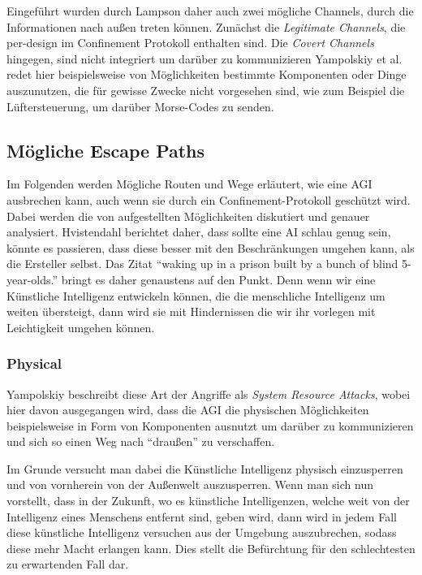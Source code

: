         Eingeführt wurden durch Lampson daher auch zwei mögliche Channels, durch die Informationen nach außen treten
        können.\cite{yampolskiy2012leakproofing} Zunächst die \textit{Legitimate Channels}, die per-design im Confinement
        Protokoll enthalten sind. Die \textit{Covert Channels} hingegen, sind nicht integriert um darüber zu kommunizieren
        Yampolskiy et al. redet hier beispielsweise von Möglichkeiten bestimmte Komponenten oder Dinge auszunutzen, die
        für gewisse Zwecke nicht vorgesehen sind, wie zum Beispiel die Lüftersteuerung, um darüber Morse-Codes zu senden.

        \subsection{Mögliche Escape Paths}
        Im Folgenden werden Mögliche Routen und Wege erläutert, wie eine AGI ausbrechen kann, auch wenn sie durch ein
        Confinement-Protokoll geschützt wird. Dabei werden die von \citep{yampolskiy2012leakproofing} aufgestellten
        Möglichkeiten diskutiert und genauer analysiert. Hvistendahl berichtet daher, dass sollte eine AI schlau genug
        sein, könnte es passieren, dass diese besser mit den Beschränkungen umgehen kann, als die Ersteller selbst.
        \cite{hvistendahl_2019} Das Zitat ``waking up in a prison built by a bunch of blind 5-year-olds.'' bringt es
        daher genaustens auf den Punkt. Denn wenn wir eine Künstliche Intelligenz entwickeln können, die die menschliche
        Intelligenz um weiten übersteigt, dann wird sie mit Hindernissen die wir ihr vorlegen mit Leichtigkeit umgehen
        können.

        \subsubsection{Physical}
        Yampolskiy beschreibt diese Art der Angriffe als \textit{System Resource Attacks}, wobei hier davon ausgegangen
        wird, dass die AGI die physischen Möglichkeiten beispielsweise in Form von Komponenten ausnutzt um darüber zu
        kommunizieren und sich so einen Weg nach ``draußen'' zu verschaffen.\cite{yampolskiy2012leakproofing}

        Im Grunde versucht man dabei die Künstliche Intelligenz physisch einzusperren und von vornherein von der Außenwelt
        auszusperren. Wenn man sich nun vorstellt, dass in der Zukunft, wo es künstliche Intelligenzen, welche weit von
        der Intelligenz eines Menschens entfernt sind, geben wird, dann wird in jedem Fall diese künstliche Intelligenz
        versuchen aus der Umgebung auszubrechen, sodass diese mehr Macht erlangen kann. Dies stellt die Befürchtung für
        den schlechtesten zu erwartenden Fall dar.\cite{yampolskiy2012leakproofing}

